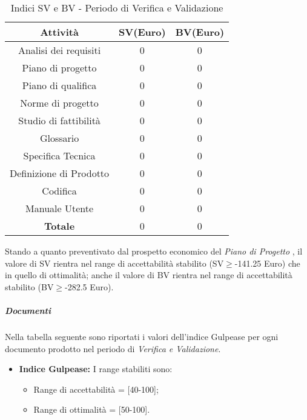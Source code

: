       \begin{table}[H]
        \centering
        \begin{tabular}{|c|c|c|}
          \hline
          \textbf{Attività} & \textbf{SV}(Euro)  & \textbf{BV}(Euro) \\
          \hline
          Analisi dei requisiti  & 0 & 0  \\
          Piano di progetto & 0 & 0\\
          Piano di qualifica  & 0  & 0\\
          Norme di progetto & 0  & 0 \\
          Studio di fattibilità & 0  & 0  \\
          Glossario & 0  & 0  \\
          Specifica Tecnica & 0 & 0\\
          Definizione di Prodotto & 0 & 0\\
          Codifica & 0 & 0\\
          Manuale Utente & 0 & 0\\
          \hline
          \textbf{Totale} & 0  & 0  \\
          \hline
        \end{tabular}
        \caption{Indici SV e BV - Periodo di Verifica e Validazione}
      \end{table}
      Stando a quanto preventivato dal prospetto economico del \emph{Piano di Progetto \VersionePP{}}, il valore di SV rientra nel range di accettabilità stabilito (SV\(\geq\)-141.25 Euro) che in quello di ottimalità;
      anche il valore di BV rientra nel range di accettabilità stabilito (BV\(\geq\)-282.5 Euro).      
      
      \subparagraph{Documenti}
      Nella tabella seguente sono riportati i valori dell'indice Gulpease per ogni documento prodotto nel periodo di \textit{Verifica e Validazione}.\\

\begin{itemize}
\item \textbf{Indice Gulpease: }I range stabiliti sono:
      \begin{itemize}
        \item Range di accettabilità = [40-100];
        \item Range di ottimalità = [50-100].
      \end{itemize}
\end{itemize}      
      
